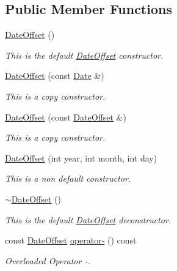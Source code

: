 \subsection*{Public Member Functions}
\begin{DoxyCompactItemize}
\item 
\hyperlink{class_date_offset_ae7d276dad52a8e2e64a57f5071f935da}{Date\+Offset} ()
\begin{DoxyCompactList}\small\item\em This is the default \hyperlink{class_date_offset}{Date\+Offset} constructor. \end{DoxyCompactList}\item 
\hyperlink{class_date_offset_a5e213fb54c765571a947813a29fa5de2}{Date\+Offset} (const \hyperlink{class_date}{Date} \&)
\begin{DoxyCompactList}\small\item\em This is a copy constructor. \end{DoxyCompactList}\item 
\hyperlink{class_date_offset_aa4af09f70e978f2788462da2c640e491}{Date\+Offset} (const \hyperlink{class_date_offset}{Date\+Offset} \&)
\begin{DoxyCompactList}\small\item\em This is a copy constructor. \end{DoxyCompactList}\item 
\hyperlink{class_date_offset_a408a6346abbade92bd529a2173355854}{Date\+Offset} (int year, int month, int day)
\begin{DoxyCompactList}\small\item\em This is a non default constructor. \end{DoxyCompactList}\item 
\hyperlink{class_date_offset_a16163537e497743f3e8648be23150eef}{$\sim$\+Date\+Offset} ()
\begin{DoxyCompactList}\small\item\em This is the default \hyperlink{class_date_offset}{Date\+Offset} deconstructor. \end{DoxyCompactList}\item 
const \hyperlink{class_date_offset}{Date\+Offset} \hyperlink{class_date_offset_a64a1de182cdfb6b62cbde8893e0b211d}{operator-\/} () const 
\begin{DoxyCompactList}\small\item\em Overloaded Operator -\/. \end{DoxyCompactList}\end{DoxyCompactItemize}
